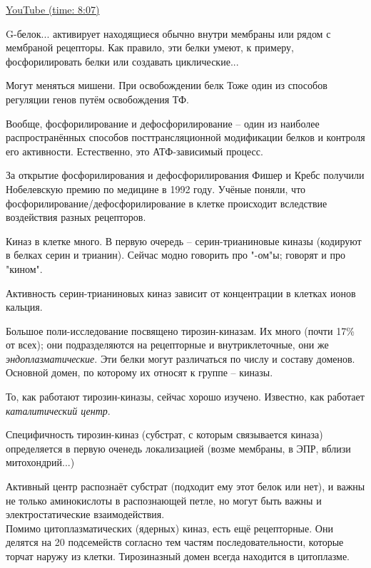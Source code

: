 \documentclass[main.tex]{subfiles}
\begin{document}
\href{https://youtu.be/zbtDvIQ53lA?t=487}{YouTube (time: 8:07)}

G-белок... активирует находящиеся обычно внутри мембраны или рядом с мембраной рецепторы.
Как правило, эти белки умеют, к примеру, фосфорилировать белки или создавать циклические...

Могут меняться мишени.
При освобождении белк %
Тоже один из способов регуляции генов путём освобождения ТФ.

Вообще, фосфорилирование и дефосфорилирование -- один из наиболее распространённых способов посттрансляционной модификации белков и контроля его активности.
Естественно, это АТФ-зависимый процесс.

За открытие фосфорилирования и дефосфорилирования Фишер и Кребс получили Нобелевскую премию по медицине в 1992 году.
Учёные поняли, что фосфорилирование/дефосфорилирование в клетке происходит вследствие воздействия разных рецепторов.

Киназ в клетке много.
В первую очередь -- серин-трианиновые киназы (кодируют в белках серин и трианин).
Сейчас модно говорить про "-ом"ы; говорят и про "кином".

Активность серин-трианиновых киназ зависит от концентрации в клетках ионов кальция.

Большое поли-исследование посвящено тирозин-киназам.
Их много (почти 17\% от всех); они подразделяются на рецепторные и внутриклеточные, они же \emph{эндоплазматические}.
Эти белки могут различаться по числу и составу доменов.
Основной домен, по которому их относят к группе -- киназы.


То, как работают тирозин-киназы, сейчас хорошо изучено.
Известно, как работает \emph{каталитический центр}.

Специфичность тирозин-киназ (субстрат, с которым связывается киназа) определяется в первую оченедь локализацией (возме мембраны, в ЭПР, вблизи митохондрий...) %

Активный центр распознаёт субстрат (подходит ему этот белок или нет), и важны не только аминокислоты в распознающей петле, но могут быть важны и электростатические взаимодействия. \\

Помимо цитоплазматических (ядерных) киназ, есть ещё рецепторные.
Они делятся на 20 подсемейств согласно тем частям последовательности, которые торчат наружу из клетки.
Тирозиназный домен всегда находится в цитоплазме.
\end{document}
